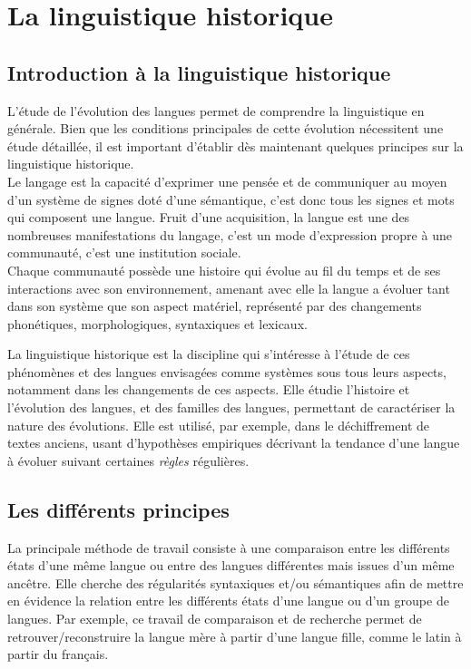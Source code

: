 \documentclass[12pt, twoside]{report}
\begin{document}
\section{La linguistique historique}
\subsection{Introduction à la linguistique historique}

L'étude de l'évolution des langues permet de comprendre la linguistique en générale. Bien que les conditions principales de cette évolution nécessitent une étude détaillée, il est important d'établir dès maintenant quelques principes sur la linguistique historique.\\

Le langage est la capacité d'exprimer une pensée et de communiquer au moyen d'un système de signes doté d'une sémantique, c'est donc tous les signes et mots qui composent une langue. Fruit d'une acquisition, la langue est une des nombreuses manifestations du langage, c'est un mode d'expression propre à une communauté, c'est une institution sociale.\\
Chaque communauté possède une histoire qui évolue au fil du temps et de ses interactions avec son environnement, amenant avec elle la langue a évoluer tant dans son système que son aspect matériel, représenté par des changements phonétiques, morphologiques, syntaxiques et lexicaux.

La linguistique historique est la discipline qui s'intéresse à l'étude de ces phénomènes et des langues envisagées comme systèmes sous tous leurs aspects, notamment dans les changements de ces aspects. Elle étudie l'histoire et l'évolution des langues, et des familles des langues, permettant de caractériser la nature des évolutions. Elle est utilisé, par exemple, dans le déchiffrement de textes anciens, usant d'hypothèses empiriques décrivant la tendance d'une langue à évoluer suivant certaines \textit{règles} régulières.\\

\subsection{Les différents principes} \label{principesLinguistique}

La principale méthode de travail consiste à une comparaison entre les différents états d'une même langue ou entre des langues différentes mais issues d'un même ancêtre. Elle cherche des régularités syntaxiques et/ou sémantiques afin de mettre en évidence la relation entre les différents états d'une langue ou d'un groupe de langues. Par exemple, ce travail de comparaison et de recherche permet de retrouver/reconstruire la langue mère à partir d'une langue fille, comme le latin à partir du français.\\
\end{document}
